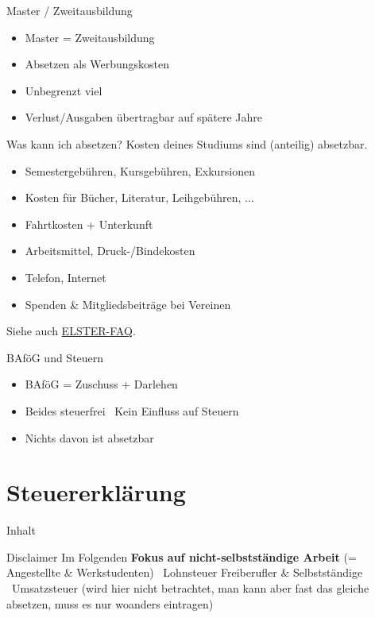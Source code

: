 \documentclass{beamer}
\begin{document}
		\begin{frame}{Master / Zweitausbildung}
			\begin{itemize}
				\item Master = Zweitausbildung
				\item Absetzen als Werbungskosten
				\item Unbegrenzt viel
				\item Verlust/Ausgaben übertragbar auf spätere Jahre
			\end{itemize}
		\end{frame}
	
		\begin{frame}{Was kann ich absetzen?}
			Kosten deines Studiums sind (anteilig) absetzbar.\n
			\begin{itemize}
				\item Semestergebühren, Kursgebühren, Exkursionen
				\item Kosten für Bücher, Literatur, Leihgebühren, ...
				\item Fahrtkosten + Unterkunft
				\item Arbeitsmittel, Druck-/Bindekosten
				\item Telefon, Internet
				\item Spenden \& Mitgliedsbeiträge bei Vereinen
			\end{itemize}\n
			Siehe auch \href{https://www.elster.de/eportal/helpGlobal?themaGlobal=help_est_ufa_10_2023\#c9718}{ELSTER-FAQ}.
		\end{frame}
	
		\begin{frame}{BAföG und Steuern}
			\begin{itemize}
				\item BAföG = Zuschuss + Darlehen
				\item Beides steuerfrei \textrightarrow\ Kein Einfluss auf Steuern
				\item Nichts davon ist absetzbar
			\end{itemize}
		\end{frame}
	
	\section{Steuererklärung}
	
		\begin{frame}[t]{Inhalt}
		\end{frame}
	
		\begin{frame}{Disclaimer}
			Im Folgenden \textbf{Fokus auf nicht-selbstständige Arbeit} (= Angestellte \& Werkstudenten) \textrightarrow\ Lohnsteuer\n\pause
			Freiberufler \& Selbstständige \textrightarrow\ Umsatzsteuer (wird hier nicht betrachtet, man kann aber fast das gleiche absetzen, muss es nur woanders eintragen)
		\end{frame}
	
\end{document}
